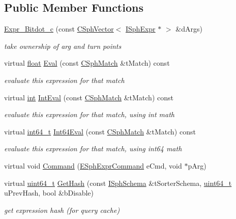\subsection*{Public Member Functions}
\begin{DoxyCompactItemize}
\item 
\hyperlink{classExpr__Bitdot__c_a9d6e538a4237b0f0a7f2a38529f149b2}{Expr\-\_\-\-Bitdot\-\_\-c} (const \hyperlink{classCSphVector}{C\-Sph\-Vector}$<$ \hyperlink{structISphExpr}{I\-Sph\-Expr} $\ast$ $>$ \&d\-Args)
\begin{DoxyCompactList}\small\item\em take ownership of arg and turn points \end{DoxyCompactList}\item 
virtual \hyperlink{sphinxexpr_8cpp_a0e0d0739f7035f18f949c2db2c6759ec}{float} \hyperlink{classExpr__Bitdot__c_acb3ba1eb4982b7fc9169c3b25f1a8939}{Eval} (const \hyperlink{classCSphMatch}{C\-Sph\-Match} \&t\-Match) const 
\begin{DoxyCompactList}\small\item\em evaluate this expression for that match \end{DoxyCompactList}\item 
virtual \hyperlink{sphinxexpr_8cpp_a4a26e8f9cb8b736e0c4cbf4d16de985e}{int} \hyperlink{classExpr__Bitdot__c_ad2c965e369c5bd7e3d27a2b5a399f8b8}{Int\-Eval} (const \hyperlink{classCSphMatch}{C\-Sph\-Match} \&t\-Match) const 
\begin{DoxyCompactList}\small\item\em evaluate this expression for that match, using int math \end{DoxyCompactList}\item 
virtual \hyperlink{sphinxstd_8h_a996e72f71b11a5bb8b3b7b6936b1516d}{int64\-\_\-t} \hyperlink{classExpr__Bitdot__c_a0e902529926cba4c0a7f1ff6b7a67308}{Int64\-Eval} (const \hyperlink{classCSphMatch}{C\-Sph\-Match} \&t\-Match) const 
\begin{DoxyCompactList}\small\item\em evaluate this expression for that match, using int64 math \end{DoxyCompactList}\item 
virtual void \hyperlink{classExpr__Bitdot__c_a87ca4168447a76d7bd41edaf599bae49}{Command} (\hyperlink{sphinxexpr_8h_a30be184fb07bd80c271360fc6094c818}{E\-Sph\-Expr\-Command} e\-Cmd, void $\ast$p\-Arg)
\item 
virtual \hyperlink{sphinxstd_8h_aaa5d1cd013383c889537491c3cfd9aad}{uint64\-\_\-t} \hyperlink{classExpr__Bitdot__c_a2f0d69c447cd9c5fe5980af9c4f9940c}{Get\-Hash} (const \hyperlink{classISphSchema}{I\-Sph\-Schema} \&t\-Sorter\-Schema, \hyperlink{sphinxstd_8h_aaa5d1cd013383c889537491c3cfd9aad}{uint64\-\_\-t} u\-Prev\-Hash, bool \&b\-Disable)
\begin{DoxyCompactList}\small\item\em get expression hash (for query cache) \end{DoxyCompactList}\end{DoxyCompactItemize}
